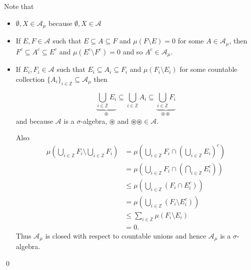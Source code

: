 \documentclass{unswmaths}
\begin{document}
\subsection{}
Note that 
\begin{itemize}
    \item $ \emptyset, X \in \mathcal{A}_\mu $ because $ \emptyset, X \in \mathcal{A} $
    \item If $ E , F \in \mathcal{A} $ such that $ E \subseteq A \subseteq F $ and $ \mu(F\setminus E) = 0 $ for some $ A \in \mathcal{A}_\mu $, then $ F^c \subseteq A^c \subseteq E^c $ and $ \mu(E^c \setminus F^c ) = 0 $ and so $ A^c \in \mathcal{A}_\mu $.
    \item If $ E_i, F_i \in \mathcal{A} $ such that $ E_i \subseteq A_i \subseteq F_i $ and $ \mu(F_i \setminus E_i) $ for some countable collection $ \{ A_i \}_{i \in \mathbb{Z}} \subseteq \mathcal{A}_\mu $ then
    
    $$
        \underbrace{\bigcup_{i \in \mathbb{Z}} E_i}_{\circledast} \subseteq \bigcup_{i \in \mathbb{Z}} A_i \subseteq \underbrace{\bigcup_{i \in \mathbb{Z}} F_i}_{\circledast \circledast}
    $$
    and because $ \mathcal{A} $ is a $ \sigma$-algebra, $ \circledast $ and $ \circledast \circledast \in \mathcal{A} $.
    
    Also
    \begin{align*}
        \mu\left(\bigcup_{i\in\mathbb{Z}} F_i \setminus \bigcup_{i\in\mathbb{Z}} F_i \right) &= \mu\left(\bigcup_{i\in\mathbb{Z}} F_i \cap \left(\bigcup_{i\in\mathbb{Z}} E_i\right)^c \right) \\
            &= \mu\left(\bigcup_{i\in\mathbb{Z}} F_i \cap \left(\bigcap_{i\in\mathbb{Z}} E_i^c\right) \right) \\
            &\leq \mu\left(\bigcup_{i\in\mathbb{Z}} \left(F_i \cap E_i^c \right) \right) \\
            &= \mu\left(\bigcup_{i\in\mathbb{Z}} \left(F_i \setminus E_i^c \right) \right) \\
            &\leq \sum_{i \in \mathbb{Z}} \mu( F_i \setminus E_i) \\
            &= 0.
    \end{align*}
    Thus $ \mathcal{A}_\mu $ is closed with respect to countable unions and hence $ \mathcal{A}_\mu $ is a $\sigma$-algebra.
\end{itemize}
\qed
\end{document}

